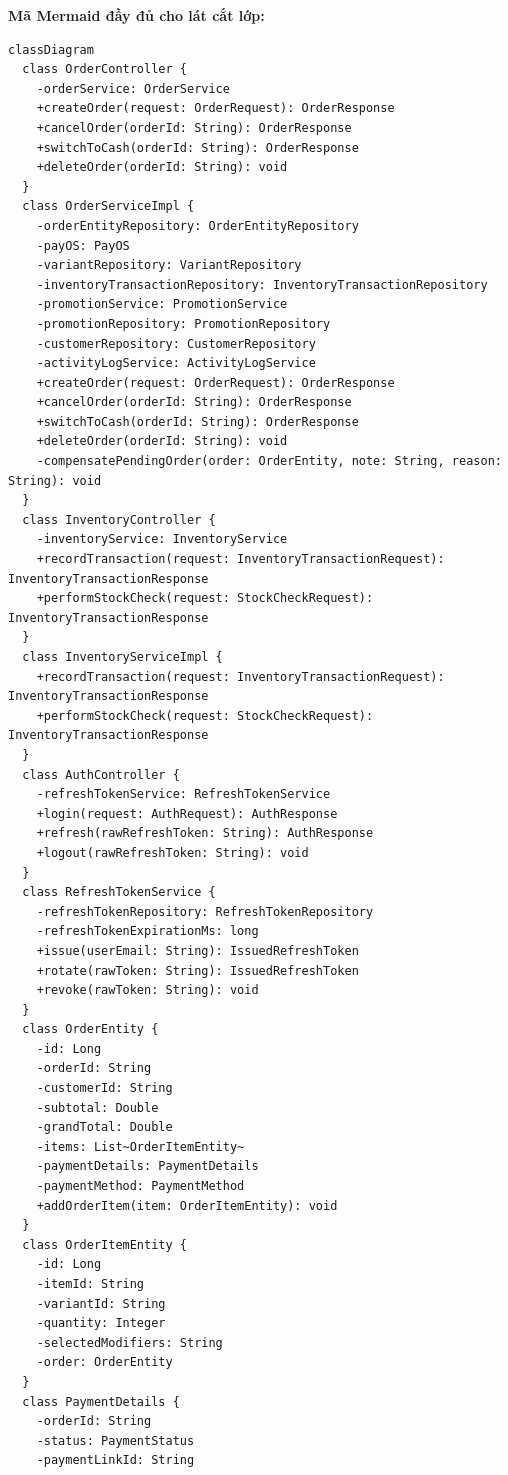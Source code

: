 \documentclass[12pt,a4paper,oneside]{report}
\begin{document}
\noindent\textbf{Mã Mermaid đầy đủ cho lát cắt lớp:}
\begin{lstlisting}[style=mermaid,caption={Sơ đồ lớp chi tiết ở dạng Mermaid classDiagram},label={lst:class-diagram}]
classDiagram
  class OrderController {
    -orderService: OrderService
    +createOrder(request: OrderRequest): OrderResponse
    +cancelOrder(orderId: String): OrderResponse
    +switchToCash(orderId: String): OrderResponse
    +deleteOrder(orderId: String): void
  }
  class OrderServiceImpl {
    -orderEntityRepository: OrderEntityRepository
    -payOS: PayOS
    -variantRepository: VariantRepository
    -inventoryTransactionRepository: InventoryTransactionRepository
    -promotionService: PromotionService
    -promotionRepository: PromotionRepository
    -customerRepository: CustomerRepository
    -activityLogService: ActivityLogService
    +createOrder(request: OrderRequest): OrderResponse
    +cancelOrder(orderId: String): OrderResponse
    +switchToCash(orderId: String): OrderResponse
    +deleteOrder(orderId: String): void
    -compensatePendingOrder(order: OrderEntity, note: String, reason: String): void
  }
  class InventoryController {
    -inventoryService: InventoryService
    +recordTransaction(request: InventoryTransactionRequest): InventoryTransactionResponse
    +performStockCheck(request: StockCheckRequest): InventoryTransactionResponse
  }
  class InventoryServiceImpl {
    +recordTransaction(request: InventoryTransactionRequest): InventoryTransactionResponse
    +performStockCheck(request: StockCheckRequest): InventoryTransactionResponse
  }
  class AuthController {
    -refreshTokenService: RefreshTokenService
    +login(request: AuthRequest): AuthResponse
    +refresh(rawRefreshToken: String): AuthResponse
    +logout(rawRefreshToken: String): void
  }
  class RefreshTokenService {
    -refreshTokenRepository: RefreshTokenRepository
    -refreshTokenExpirationMs: long
    +issue(userEmail: String): IssuedRefreshToken
    +rotate(rawToken: String): IssuedRefreshToken
    +revoke(rawToken: String): void
  }
  class OrderEntity {
    -id: Long
    -orderId: String
    -customerId: String
    -subtotal: Double
    -grandTotal: Double
    -items: List~OrderItemEntity~
    -paymentDetails: PaymentDetails
    -paymentMethod: PaymentMethod
    +addOrderItem(item: OrderItemEntity): void
  }
  class OrderItemEntity {
    -id: Long
    -itemId: String
    -variantId: String
    -quantity: Integer
    -selectedModifiers: String
    -order: OrderEntity
  }
  class PaymentDetails {
    -orderId: String
    -status: PaymentStatus
    -paymentLinkId: String

\end{lstlisting}
\end{document}
